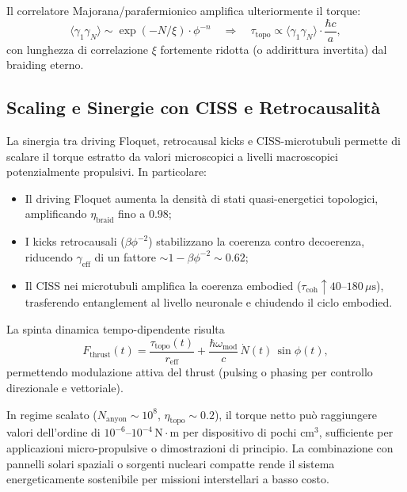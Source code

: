 \documentclass[11pt,a4paper]{article}
\theoremstyle{plain}
\theoremstyle{definition}
\begin{document}
Il correlatore Majorana/parafermionico amplifica ulteriormente il torque:
\begin{equation}
\langle \gamma_1 \gamma_N \rangle \sim \exp\left( -N / \xi \right) \cdot \phi^{-n} \quad \Rightarrow \quad \tau_{\mathrm{topo}} \propto \langle \gamma_1 \gamma_N \rangle \cdot \frac{\hbar c}{a},
\label{eq:majorana-torque}
\end{equation}
con lunghezza di correlazione $\xi$ fortemente ridotta (o addirittura invertita) dal braiding eterno.

\subsection{Scaling e Sinergie con CISS e Retrocausalità}

La sinergia tra driving Floquet, retrocausal kicks e CISS-microtubuli permette di scalare il torque estratto da valori microscopici a livelli macroscopici potenzialmente propulsivi. In particolare:
\begin{itemize}
    \item Il driving Floquet aumenta la densità di stati quasi-energetici topologici, amplificando $\eta_{\mathrm{braid}}$ fino a 0.98;
    \item I kicks retrocausali ($\beta \phi^{-2}$) stabilizzano la coerenza contro decoerenza, riducendo $\gamma_{\mathrm{eff}}$ di un fattore $\sim 1 - \beta \phi^{-2} \sim 0.62$;
    \item Il CISS nei microtubuli amplifica la coerenza embodied ($\tau_{\mathrm{coh}} \uparrow 40$--$180\,\mu\mathrm{s}$), trasferendo entanglement al livello neuronale e chiudendo il ciclo embodied.
\end{itemize}

La spinta dinamica tempo-dipendente risulta
\begin{equation}
F_{\mathrm{thrust}}(t) = \frac{\tau_{\mathrm{topo}}(t)}{r_{\mathrm{eff}}} + \frac{\hbar \omega_{\mathrm{mod}}}{c} \, \dot{N}(t) \, \sin\phi(t),
\label{eq:thrust-dynamic}
\end{equation}
permettendo modulazione attiva del thrust (pulsing o phasing per controllo direzionale e vettoriale).

In regime scalato ($N_{\mathrm{anyon}} \sim 10^8$, $\eta_{\mathrm{topo}} \sim 0.2$), il torque netto può raggiungere valori dell'ordine di $10^{-6}$--$10^{-4}\,\mathrm{N \cdot m}$ per dispositivo di pochi cm$^3$, sufficiente per applicazioni micro-propulsive o dimostrazioni di principio. La combinazione con pannelli solari spaziali o sorgenti nucleari compatte rende il sistema energeticamente sostenibile per missioni interstellari a basso costo.
\end{document}
